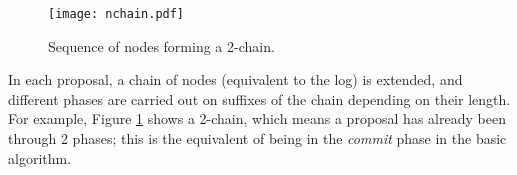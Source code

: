 \begin{figure}[h!]
\centering
\texttt{[image: nchain.pdf]}
\caption{Sequence of nodes forming a 2-chain.}
\label{nchain}
\end{figure}

In each proposal, a chain of nodes (equivalent to the log) is extended, and different phases are carried out on suffixes of the chain depending on their length. For example, Figure \ref{nchain} shows a 2-chain, which means a proposal has already been through 2 phases; this is the equivalent of being in the \textit{commit} phase in the basic algorithm.



